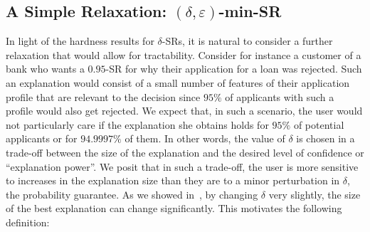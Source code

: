 \subsection{A Simple Relaxation: $(\delta, \varepsilon)$-min-SR}

In light of the hardness results for $\delta$-SRs, it is natural to consider a further relaxation that would allow for tractability. Consider for instance a customer of a bank who wants a $0.95$-SR for why their application for a loan was rejected. Such an explanation would consist of a small number of features of their application profile that are relevant to the decision since $95\%$ of applicants with such a profile would also get rejected. We expect that, in such a scenario, the user would not particularly care if the explanation she obtains holds 
for $95\%$ of potential applicants or for $94.9997\%$ of them. In other words, the value of $\delta$ is chosen in a trade-off between the size of the explanation and the desired level of confidence or ``explanation power''. We posit that in such a trade-off, the user is more sensitive to increases in the explanation size than they are to a minor perturbation in $\delta$, the probability guarantee. As we showed in~, by changing $\delta$ very slightly, the size of the best explanation can change significantly. This motivates the following definition:


